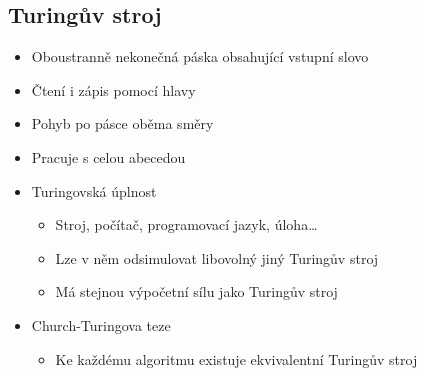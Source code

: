 \documentclass[openany]{book}
\begin{document}
\subsection{Turingův stroj}
\begin{itemize}
    \item Oboustranně nekonečná páska obsahující vstupní slovo
    \item Čtení i zápis pomocí hlavy
    \item Pohyb po pásce oběma směry
    \item Pracuje s celou abecedou
    \item Turingovská úplnost
    \begin{itemize}
        \item Stroj, počítač, programovací jazyk, úloha\dots
        \item Lze v něm odsimulovat libovolný jiný Turingův stroj
        \item Má stejnou výpočetní sílu jako Turingův stroj
    \end{itemize}
    \item Church-Turingova teze
    \begin{itemize}
        \item Ke každému algoritmu existuje ekvivalentní Turingův stroj
    \end{itemize}
\end{itemize}
\end{document}

